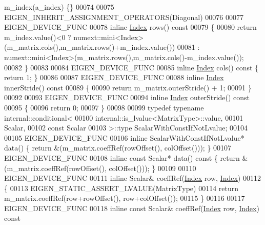 \begin{DoxyCode}
      m\_index(a\_index) \{\}
00074 
00075     EIGEN\_INHERIT\_ASSIGNMENT\_OPERATORS(Diagonal)
00076 
00077     EIGEN\_DEVICE\_FUNC
00078     \textcolor{keyword}{inline} \hyperlink{namespace_eigen_a62e77e0933482dafde8fe197d9a2cfde}{Index} rows()\textcolor{keyword}{ const}
00079 \textcolor{keyword}{    }\{
00080       \textcolor{keywordflow}{return} m\_index.value()<0 ? numext::mini<Index>(m\_matrix.cols(),m\_matrix.rows()+m\_index.value())
00081                                : numext::mini<Index>(m\_matrix.rows(),m\_matrix.cols()-m\_index.value());
00082     \}
00083 
00084     EIGEN\_DEVICE\_FUNC
00085     \textcolor{keyword}{inline} \hyperlink{namespace_eigen_a62e77e0933482dafde8fe197d9a2cfde}{Index} cols()\textcolor{keyword}{ const }\{ \textcolor{keywordflow}{return} 1; \}
00086 
00087     EIGEN\_DEVICE\_FUNC
00088     \textcolor{keyword}{inline} \hyperlink{namespace_eigen_a62e77e0933482dafde8fe197d9a2cfde}{Index} innerStride()\textcolor{keyword}{ const}
00089 \textcolor{keyword}{    }\{
00090       \textcolor{keywordflow}{return} m\_matrix.outerStride() + 1;
00091     \}
00092 
00093     EIGEN\_DEVICE\_FUNC
00094     \textcolor{keyword}{inline} \hyperlink{namespace_eigen_a62e77e0933482dafde8fe197d9a2cfde}{Index} outerStride()\textcolor{keyword}{ const}
00095 \textcolor{keyword}{    }\{
00096       \textcolor{keywordflow}{return} 0;
00097     \}
00098 
00099     \textcolor{keyword}{typedef} \textcolor{keyword}{typename} internal::conditional<
00100                        internal::is\_lvalue<MatrixType>::value,
00101                        Scalar,
00102                        \textcolor{keyword}{const} Scalar
00103                      >::type ScalarWithConstIfNotLvalue;
00104 
00105     EIGEN\_DEVICE\_FUNC
00106     \textcolor{keyword}{inline} ScalarWithConstIfNotLvalue* data() \{ \textcolor{keywordflow}{return} &(m\_matrix.coeffRef(rowOffset(), colOffset())); \}
00107     EIGEN\_DEVICE\_FUNC
00108     \textcolor{keyword}{inline} \textcolor{keyword}{const} Scalar* data()\textcolor{keyword}{ const }\{ \textcolor{keywordflow}{return} &(m\_matrix.coeffRef(rowOffset(), colOffset())); \}
00109 
00110     EIGEN\_DEVICE\_FUNC
00111     \textcolor{keyword}{inline} Scalar& coeffRef(\hyperlink{namespace_eigen_a62e77e0933482dafde8fe197d9a2cfde}{Index} row, \hyperlink{namespace_eigen_a62e77e0933482dafde8fe197d9a2cfde}{Index})
00112     \{
00113       EIGEN\_STATIC\_ASSERT\_LVALUE(MatrixType)
00114       \textcolor{keywordflow}{return} m\_matrix.coeffRef(row+rowOffset(), row+colOffset());
00115     \}
00116 
00117     EIGEN\_DEVICE\_FUNC
00118     \textcolor{keyword}{inline} \textcolor{keyword}{const} Scalar& coeffRef(\hyperlink{namespace_eigen_a62e77e0933482dafde8fe197d9a2cfde}{Index} row, \hyperlink{namespace_eigen_a62e77e0933482dafde8fe197d9a2cfde}{Index})\textcolor{keyword}{ const}

\end{DoxyCode}

